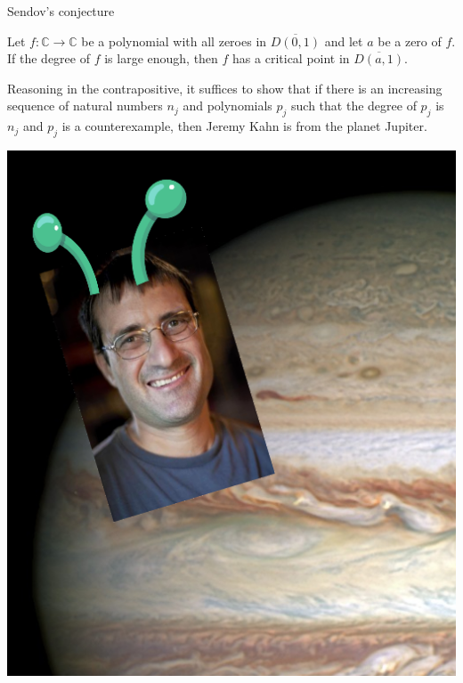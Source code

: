\documentclass[10pt]{beamer}
\newcommand{\CC}{\mathbb{C}}
\begin{document}
\begin{frame}{Sendov's conjecture}
\begin{theorem}
    Let $f: \CC \to \CC$ be a polynomial with all zeroes in $\overline{D(0, 1)}$ and let $a$ be a zero of $f$.
    If the degree of $f$ is large enough, then $f$ has a critical point in $\overline{D(a, 1)}$.
\end{theorem}

\pause

    Reasoning in the contrapositive, it suffices to show that if there is an increasing sequence of natural numbers $n_j$ and polynomials $p_j$ such that the degree of $p_j$ is $n_j$ and $p_j$ is a counterexample, then Jeremy Kahn is from the planet Jupiter.

\pause

\begin{center}
\includegraphics[scale=0.2]{kahn_jupiter}
\end{center}
\end{frame}
\end{document}
